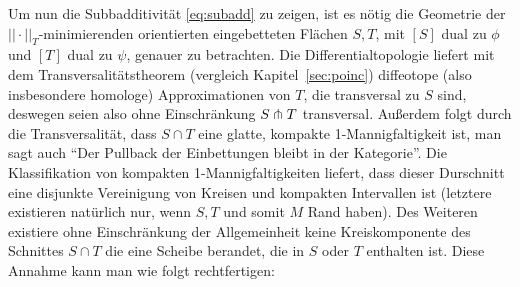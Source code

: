             Um nun die Subbadditivität \eqref{eq:subadd} zu zeigen, ist es nötig die Geometrie der $||\cdot||_T$-minimierenden orientierten eingebetteten Flächen $S,T$, mit $[S]$ dual zu $\phi$ und $[T]$ dual zu $\psi$, genauer zu betrachten. Die Differentialtopologie liefert mit dem Transversalitätstheorem (vergleich Kapitel~\ref{sec:poinc}) diffeotope (also insbesondere homologe) Approximationen von $T$, die transversal zu $S$ sind, deswegen seien also ohne Einschränkung $S \pitchfork T$ transversal. Außerdem folgt durch die Transversalität, dass $S\cap T$ eine glatte, kompakte 1-Mannigfaltigkeit ist, man sagt auch "`Der Pullback der Einbettungen bleibt in der Kategorie"'. Die Klassifikation von kompakten 1-Mannigfaltigkeiten liefert, dass dieser Durschnitt eine disjunkte Vereinigung von Kreisen und kompakten Intervallen ist (letztere existieren natürlich nur, wenn $S,T$ und somit $M$ Rand haben). Des Weiteren existiere ohne Einschränkung der Allgemeinheit keine Kreiskomponente des Schnittes $S\cap T$ die eine Scheibe berandet, die in $S$ oder $T$ enthalten ist. Diese Annahme kann man wie folgt rechtfertigen:

